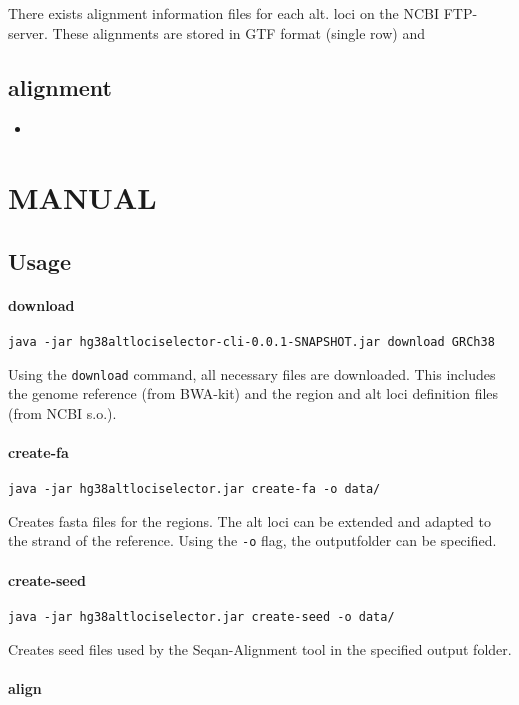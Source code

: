 \documentclass[10pt,a4paper]{article}
\begin{document}
There exists alignment information files for each alt. loci on the NCBI FTP-server. These alignments are stored in GTF format (single row) and 

\subsection*{alignment}

\begin{itemize}
\item 
\end{itemize}

\section*{MANUAL}

\subsection*{Usage}

\paragraph*{download}

\begin{verbatim}
java -jar hg38altlociselector-cli-0.0.1-SNAPSHOT.jar download GRCh38
\end{verbatim}

Using the \texttt{download} command, all necessary files are downloaded. This includes the genome reference (from BWA-kit) and the region and alt loci definition files (from NCBI s.o.).

\paragraph*{create-fa}
\begin{verbatim}
java -jar hg38altlociselector.jar create-fa -o data/
\end{verbatim}

Creates fasta files for the regions. The alt loci can be extended and adapted to the strand of the reference. Using the \texttt{-o} flag, the outputfolder can be specified.

\paragraph*{create-seed}
\begin{verbatim}
java -jar hg38altlociselector.jar create-seed -o data/
\end{verbatim}

Creates seed files used by the Seqan-Alignment tool in the specified output folder.

\paragraph*{align}
\end{document}
